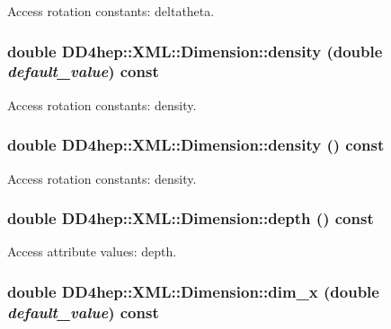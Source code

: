 Access rotation constants: deltatheta. \hypertarget{struct_d_d4hep_1_1_x_m_l_1_1_dimension_af43e6dbff63a271cdd79dd52c2a5f21c}{
\subsubsection[{density}]{\setlength{\rightskip}{0pt plus 5cm}double DD4hep::XML::Dimension::density (double {\em default\_\-value}) const}}
\label{struct_d_d4hep_1_1_x_m_l_1_1_dimension_af43e6dbff63a271cdd79dd52c2a5f21c}


Access rotation constants: density. \hypertarget{struct_d_d4hep_1_1_x_m_l_1_1_dimension_acbecea58454bf456672bc673f54eb570}{
\subsubsection[{density}]{\setlength{\rightskip}{0pt plus 5cm}double DD4hep::XML::Dimension::density () const}}
\label{struct_d_d4hep_1_1_x_m_l_1_1_dimension_acbecea58454bf456672bc673f54eb570}


Access rotation constants: density. \hypertarget{struct_d_d4hep_1_1_x_m_l_1_1_dimension_ab0a01a737c6ab027c8d5feab51b356fb}{
\subsubsection[{depth}]{\setlength{\rightskip}{0pt plus 5cm}double DD4hep::XML::Dimension::depth () const}}
\label{struct_d_d4hep_1_1_x_m_l_1_1_dimension_ab0a01a737c6ab027c8d5feab51b356fb}


Access attribute values: depth. \hypertarget{struct_d_d4hep_1_1_x_m_l_1_1_dimension_aaad1017a023c4ac317d9e2cce0e76df7}{
\subsubsection[{dim\_\-x}]{\setlength{\rightskip}{0pt plus 5cm}double DD4hep::XML::Dimension::dim\_\-x (double {\em default\_\-value}) const}}
\label{struct_d_d4hep_1_1_x_m_l_1_1_dimension_aaad1017a023c4ac317d9e2cce0e76df7}


